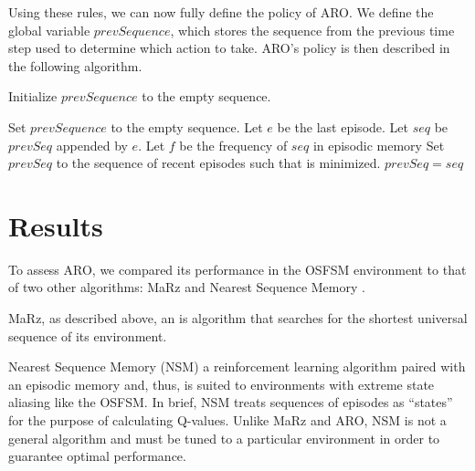 \documentclass[letterpaper]{article} %
\begin{document}
Using these rules, we can now fully define the policy of ARO. We define the global variable $prevSequence$, which stores the sequence from the previous time step used to determine which action to take. ARO's policy is then described in the following algorithm.



\begin{algorithmic}
	
	\State Initialize $prevSequence$ to the empty sequence.

			\State Set $prevSequence$ to the empty sequence.
			\State \Return
		\EndIf
		\State Let $e$ be the last episode.
		\State Let $seq$ be $prevSeq$ appended by $e$.
		\State Let $f$ be the frequency of $seq$ in episodic memory
			\State Set $prevSeq$ to the sequence of recent episodes such that  is minimized.
			\State \Return {}
		\Else
			\State $prevSeq = seq$
			\State \Return {}
		\EndIf
		
	\EndFunction
	
\end{algorithmic}



\section{Results}

To assess ARO, we compared its performance in the OSFSM environment to
that of two other algorithms: MaRz \cite{Rodriguez17} and Nearest
Sequence Memory \cite{McCallum95}.

MaRz, as described above, an is algorithm that searches for the
shortest universal sequence of its environment.

Nearest Sequence Memory (NSM) a reinforcement learning algorithm
paired with an episodic memory and, thus, is suited to environments
with extreme state aliasing like the OSFSM.  In brief, NSM treats
sequences of episodes as ``states'' for the purpose of calculating
Q-values.  Unlike MaRz and ARO, NSM is not a general algorithm and
must be tuned to a particular environment in order to guarantee
optimal performance.
\end{document}

